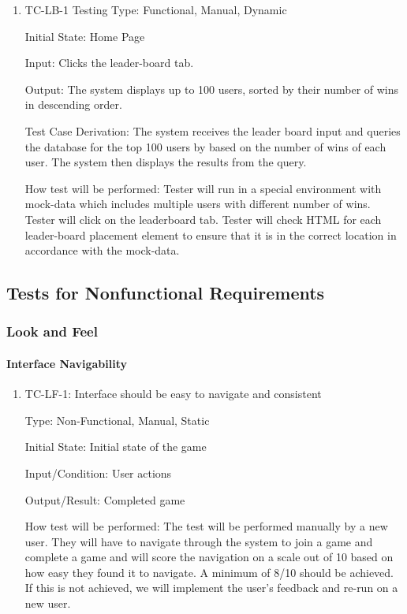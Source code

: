 \documentclass[12pt, titlepage]{article}
\begin{document}
\begin{enumerate}
    \item {TC-LB-1}
    Testing Type: Functional, Manual, Dynamic
					
Initial State: Home Page
					
Input: Clicks the leader-board tab.
					
Output: The system displays up to 100 users, sorted by their number of wins in descending order.

Test Case Derivation: The system receives the leader board input and queries the database for the top 100 users by based on the number of wins of each user. The system then displays the results from the query.
					
How test will be performed: Tester will run in a special environment with mock-data which includes multiple users with different number of wins. Tester will click on the leaderboard tab. Tester will check HTML for each leader-board placement element to ensure that it is in the correct location in accordance with the mock-data.
\end{enumerate}


\subsection{Tests for Nonfunctional Requirements}

\subsubsection{Look and Feel}

\paragraph{Interface Navigability}

\begin{enumerate}
\item{TC-LF-1: Interface should be easy to navigate and consistent}

Type: Non-Functional, Manual, Static
					
Initial State: Initial state of the game
					
Input/Condition: User actions
					
Output/Result: Completed game
					
How test will be performed: The test will be performed manually by a new user. They will have to navigate through the system to join a game and complete a game and will score the navigation on a scale out of 10 based on how easy they found it to navigate. A minimum of 8/10 should be achieved. If this is not achieved, we will implement the user's feedback and  re-run on a new user.
\end{enumerate}
\end{document}

